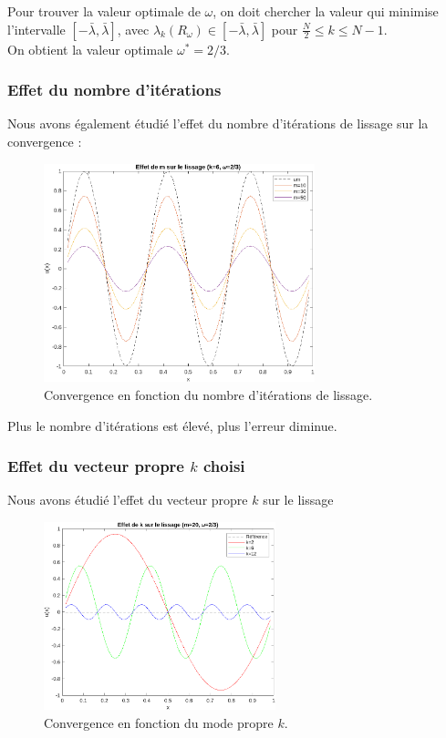 \documentclass[12pt,a4paper]{article}
\begin{document}
Pour trouver la valeur optimale de $\omega$, on doit chercher la valeur qui minimise l'intervalle $\left[-\bar{\lambda}, \bar{\lambda}\right]$, avec $\lambda_k(R_\omega) \in \left[-\bar{\lambda}, \bar{\lambda}\right]$ pour $\frac{N}{2} \leq k \leq N - 1$.\\

On obtient la valeur optimale $\omega^* = 2/3$.


\subsubsection{Effet du nombre d'itérations}
Nous avons également étudié l'effet du nombre d'itérations de lissage sur la convergence :

\begin{figure}[H]
    \centering
    \includegraphics[width=0.7\textwidth]{src/iterations.png}
    \caption{Convergence en fonction du nombre d'itérations de lissage.}
    \label{fig:iterations_convergence}
\end{figure}

Plus le nombre d'itérations est élevé, plus l'erreur diminue.


\subsubsection{Effet du vecteur propre \texorpdfstring{$k$}{k} choisi}

Nous avons étudié l'effet du vecteur propre $k$ sur le lissage

\begin{figure}[H]
    \centering
    \includegraphics[width=0.6\textwidth]{src/k.png}
    \caption{Convergence en fonction du mode propre $k$.}
    \label{fig:k_convergence}
\end{figure}
\end{document}
